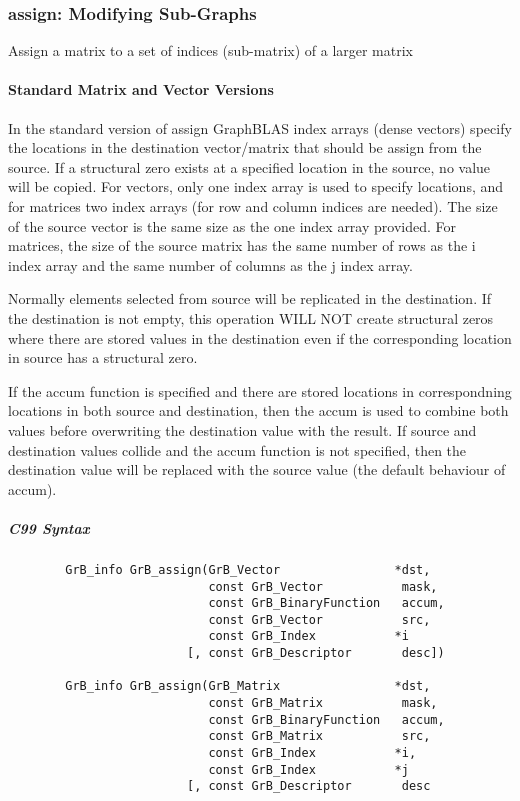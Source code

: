 \subsubsection{{\sf assign}: Modifying Sub-Graphs}

Assign a matrix to a set of indices (sub-matrix) of a larger matrix

\paragraph{Standard Matrix and Vector Versions}

In the standard version of {\sf assign} GraphBLAS index arrays (dense vectors)
specify the locations in the destination vector/matrix that should be assign from
the source.  If a structural zero exists at a specified location in the source,
no value will be copied.  For vectors, only one index array is used to specify
locations, and for matrices two index arrays (for row and column indices are needed).
The size of the source vector is the same size as the one index array provided.
For matrices, the size of the source matrix has the same number of rows as the
{\sf i} index array and the same number of columns as the {\sf j} index array.

Normally elements selected from source will be replicated in the destination.  If the
destination is not empty, this operation WILL NOT create structural zeros where there
are stored values in the destination even if the corresponding location in source 
has a structural zero.

If the {\sf accum} function is specified and there are stored locations in correspondning
locations in both source and destination, then the
{\sf accum} is used to combine both values before overwriting the destination value
with the result.  If source and destination values collide and the {\sf accum} function is
not specified, then the destination value will be replaced with the source value (the
default behaviour of {\sf accum}).

\subparagraph{C99 Syntax}

\begin{verbatim}
        GrB_info GrB_assign(GrB_Vector                *dst,
                            const GrB_Vector           mask,
                            const GrB_BinaryFunction   accum,
                            const GrB_Vector           src,
                            const GrB_Index           *i
                         [, const GrB_Descriptor       desc])

        GrB_info GrB_assign(GrB_Matrix                *dst,
                            const GrB_Matrix           mask,
                            const GrB_BinaryFunction   accum,
                            const GrB_Matrix           src,
                            const GrB_Index           *i,
                            const GrB_Index           *j
                         [, const GrB_Descriptor       desc
\end{verbatim}

